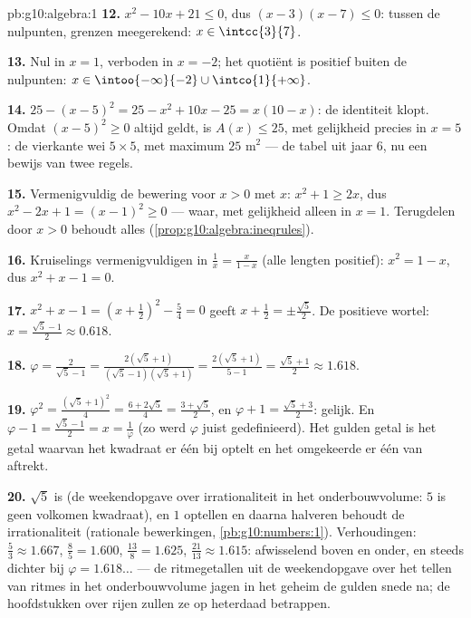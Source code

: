 \begin{solution}{pb:g10:algebra:1}
\textbf{12.} $x^2 - 10x + 21 \leq 0$, dus $(x - 3)(x - 7) \leq 0$: tussen de
nulpunten, grenzen meegerekend: $x \in \intcc{3}{7}$.

\textbf{13.} Nul in $x = 1$, verboden in $x = -2$; het quotiënt is positief
buiten de nulpunten: $x \in \intoo{-\infty}{-2} \cup \intco{1}{+\infty}$.

\textbf{14.} $25 - (x - 5)^2 = 25 - x^2 + 10x - 25 = x(10 - x)$: de
identiteit klopt. Omdat $(x-5)^2 \geq 0$ altijd geldt, is $A(x) \leq 25$, met
gelijkheid precies in $x = 5$: de vierkante wei $5 \times 5$, met maximum
$25$ m$^2$ --- de tabel uit jaar 6, nu een bewijs van twee regels.

\textbf{15.} Vermenigvuldig de bewering voor $x > 0$ met $x$:
$x^2 + 1 \geq 2x$, dus $x^2 - 2x + 1 = (x - 1)^2 \geq 0$ --- waar, met
gelijkheid alleen in $x = 1$. Terugdelen door $x > 0$ behoudt alles
(\cref{prop:g10:algebra:ineqrules}).

\textbf{16.} Kruiselings vermenigvuldigen in $\frac1x = \frac{x}{1 - x}$
(alle lengten positief): $x^2 = 1 - x$, dus $x^2 + x - 1 = 0$.

\textbf{17.} $x^2 + x - 1 = \left(x + \frac12\right)^2 - \frac54 = 0$ geeft
$x + \frac12 = \pm\frac{\sqrt5}{2}$. De positieve wortel:
$x = \frac{\sqrt5 - 1}{2} \approx 0.618$.

\textbf{18.} $\varphi = \frac{2}{\sqrt5 - 1} =
\frac{2(\sqrt5 + 1)}{(\sqrt5 - 1)(\sqrt5 + 1)}
= \frac{2(\sqrt5 + 1)}{5 - 1} = \frac{\sqrt5 + 1}{2} \approx 1.618$.

\textbf{19.} $\varphi^2 = \frac{(\sqrt5 + 1)^2}{4} = \frac{6 + 2\sqrt5}{4}
= \frac{3 + \sqrt5}{2}$, en $\varphi + 1 = \frac{\sqrt5 + 3}{2}$: gelijk. En
$\varphi - 1 = \frac{\sqrt5 - 1}{2} = x = \frac1\varphi$ (zo werd $\varphi$
juist gedefinieerd). Het gulden getal is het getal waarvan het kwadraat er
één bij optelt en het omgekeerde er één van aftrekt.

\textbf{20.} $\sqrt5$ is  (de weekendopgave over irrationaliteit
in het onderbouwvolume: $5$ is geen volkomen kwadraat), en $1$ optellen en
daarna halveren behoudt de irrationaliteit (rationale bewerkingen,
\cref{pb:g10:numbers:1}). Verhoudingen: $\frac53 \approx 1.667$,
$\frac85 = 1.600$, $\frac{13}{8} = 1.625$, $\frac{21}{13} \approx 1.615$:
afwisselend boven en onder, en steeds dichter bij
$\varphi = 1.618\ldots$ --- de ritmegetallen uit de weekendopgave over het
tellen van ritmes in het onderbouwvolume jagen in het geheim de gulden snede
na; de hoofdstukken over rijen zullen ze op heterdaad betrappen.
\end{solution}
